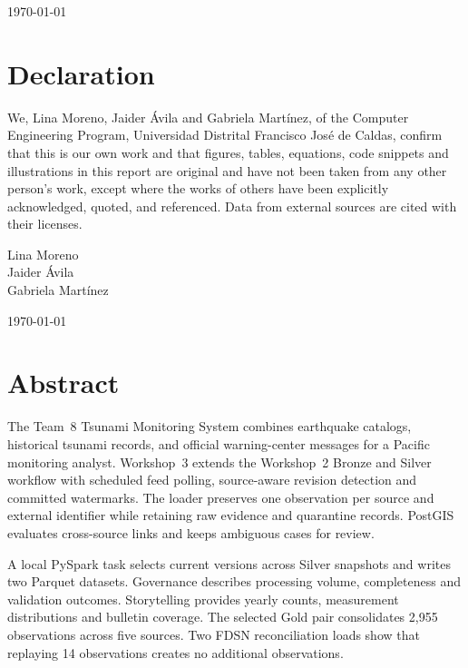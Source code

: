 \documentclass[a4paper,11pt,oneside]{book}
\begin{document}
\begin{titlepage}
\begin{center}
            \today
        \end{center}
    \end{titlepage}

    \newpage
    \thispagestyle{empty}
    \chapter*{\Large Declaration}
    We, Lina Moreno, Jaider \'Avila and Gabriela Mart\'inez, of the Computer Engineering Program, Universidad Distrital Francisco Jos\'e de Caldas, confirm that this is our own work and that figures, tables, equations, code snippets and illustrations in this report are original and have not been taken from any other person's work, except where the works of others have been explicitly acknowledged, quoted, and referenced. Data from external sources are cited with their licenses.
    ~\\[1cm]
    \begin{flushright}
    Lina Moreno\\
    Jaider \'Avila\\
    Gabriela Mart\'inez

    \today
    \end{flushright}

    \chapter*{Abstract}
The Team~8 Tsunami Monitoring System combines earthquake catalogs, historical tsunami records, and official warning-center messages for a Pacific monitoring analyst. Workshop~3 extends the Workshop~2 Bronze and Silver workflow with scheduled feed polling, source-aware revision detection and committed watermarks. The loader preserves one observation per source and external identifier while retaining raw evidence and quarantine records. PostGIS evaluates cross-source links and keeps ambiguous cases for review.

A local PySpark task selects current versions across Silver snapshots and writes two Parquet datasets. Governance describes processing volume, completeness and validation outcomes. Storytelling provides yearly counts, measurement distributions and bulletin coverage. The selected Gold pair consolidates 2,955 observations across five sources. Two FDSN reconciliation loads show that replaying 14 observations creates no additional observations.
\end{document}
